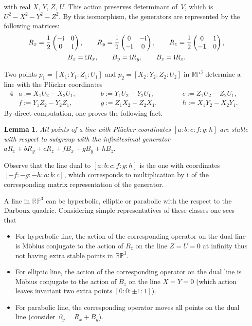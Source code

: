 \documentclass[pdftex]{sigma}
\numberwithin{equation}{section}
\newtheorem{Lemma}[Theorem]{Lemma}
\begin{document}
with real $X$, $Y$, $Z$, $U$. This action preserves determinant of~$V$, which is $U^2-X^2-Y^2-Z^2$.
By this isomorphism, the generators are represented by the following matrices:
\begin{gather*}
R_x=\frac{1}{2}\left(
\begin{matrix}
-{\rm i} & 0\\
0 & {\rm i}
\end{matrix}
 \right),\qquad
 R_y=\frac{1}{2}\left(
\begin{matrix}
0 & -{\rm i}\\
-{\rm i} & 0
\end{matrix}
 \right),\qquad
 R_z=\frac{1}{2}\left(
\begin{matrix}
0 & 1\\
-1 & 0
\end{matrix}
 \right),
\\
B_x={\rm i}R_x,\qquad B_y={\rm i}R_y, \qquad B_z={\rm i}R_z.
\end{gather*}

Two points $p_1=[X_1:Y_1:Z_1:U_1]$ and $p_2=[X_2:Y_2:Z_2:U_2]$ in $\mathbb{RP}^3$ determine a line with the Pl\"ucker coordinates
\begin{alignat*}{4}
& a:=X_1U_2-X_2U_1,\qquad&& b:=Y_1U_2-Y_2U_1, \qquad&& c:=Z_1U_2-Z_2U_1,&
\\
& f:=Y_1Z_2-Y_2Z_1,\qquad && g:=Z_1X_2-Z_2X_1, \qquad&& h:=X_1Y_2-X_2Y_1.&
\end{alignat*}
By direct computation, one proves the following fact.
\begin{Lemma}
All points of a line with Pl\"ucker coordinates $[a:b:c:f:g:h]$ are stable with respect to subgroup with the infinitesimal generator $aR_x+bR_y+cR_z+fB_x+gB_y+hB_z$.
\end{Lemma}
Observe that the line dual to $[a:b:c:f:g:h]$ is the one with coordinates $[-f:-g:-h:a:b:c]$, which corresponds to multiplication by ${\rm i}$ of the corresponding matrix representation of the generator.

A line in $\mathbb{RP}^3$ can be hyperbolic, elliptic or parabolic with the respect to the Darboux quadric. Considering simple representatives of these classes one sees that
\begin{itemize}\itemsep=0pt
\item[(1)] For hyperbolic line, the action of the corresponding operator on the dual line is M\"obius conjugate to the action of $R_z$ on the line $Z=U=0$ at infinity thus not having extra stable points in $\mathbb{RP}^3$.

\item[(2)] For elliptic line, the action of the corresponding operator on the dual line is M\"obius conjugate to the action of $B_z$ on the line $X=Y=0$ (which action leaves invariant two extra points $[0:0:\pm1:1]$).

\item[(3)] For parabolic line, the corresponding operator moves all points on the dual line (consider~${\partial_y=R_x+B_y}$).
\end{itemize}
\end{document}

